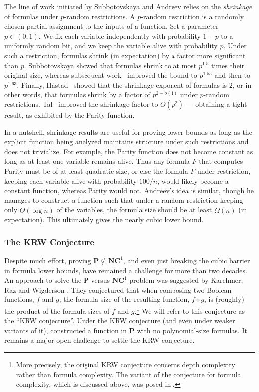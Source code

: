 \documentclass[11pt]{article}
\numberwithin{equation}{section}
\theoremstyle{definition}
\theoremstyle{plain}
\theoremstyle{definition}\newtheorem{notation}[theorem]{Notation}\theoremstyle{plain}
\renewcommand{\P}{\mathbf{P}}
\newcommand{\NC}{\mathbf{NC}}
\renewcommand{\d}{\diamond}
\theoremstyle{definition}
\theoremstyle{plain}
\begin{document}
The line of work initiated by Subbotovskaya and Andreev relies on
the \emph{shrinkage} of formulas under $p$-random restrictions. A
$p$-random restriction is a randomly chosen partial assignment to
the inputs of a function. Set a parameter $p\in(0,1)$. We fix each
variable independently with probability $1-p$ to a uniformly random
bit, and we keep the variable alive with probability $p$. Under such
a restriction, formulas shrink (in expectation) by a factor more significant
than $p$. Subbotovskaya showed that formulas shrink to
at most $p^{1.5}$ times their original size, whereas subsequent
%
work~\cite{PZ93,IN93}  %
improved the bound to $p^{1.55}$ and
then to  %
$p^{1.63}$.
%
%
%
%
Finally, H{\aa}stad~\cite{H98} showed that the shrinkage
exponent of formulas is $2$, or in other words, that 
formulas shrink by a factor of $p^{2-o(1)}$ under $p$-random restrictions.
Tal~\cite{T14} improved the shrinkage factor to $O(p^{2})$ ---
obtaining a tight result, as exhibited by the Parity function.

In a nutshell, shrinkage results are useful %
for  %
proving lower bounds
as long as the explicit function being analyzed maintains structure
under such restrictions and does not trivialize. For example, the
Parity function does not become constant as long as at least one variable
remains alive. Thus any formula $F$ that computes Parity must be
of at least quadratic size, or else the formula $F$ under restriction,
keeping each variable alive with probability $100/n$, would likely
become a constant function, whereas Parity would not. Andreev's idea
is similar, though he manages to construct a function such that under
a random restriction keeping only $\Theta(\log n)$ of the variables,
the formula size should be at least $\tilde{\Omega}(n)$ (in expectation).
This ultimately gives the nearly cubic lower bound.

%
\subsubsection{The KRW Conjecture}  %

Despite much effort, proving $\P\not\subseteq\NC^{1}$, and even just
breaking the \textsf{cubic barrier} in formula lower bounds, have
remained a challenge for more than two decades. An approach to solve
the $\P$ versus $\NC^{1}$ problem was suggested by Karchmer, Raz
and Wigderson \cite{KRW95}. They conjectured that when composing
two Boolean functions, $f$ and $g$, the formula size of the resulting
function, $f\d g$, is (roughly) the product of the formula sizes
of $f$ and $g$.\footnote{More precisely, the original KRW conjecture \cite{KRW95} concerns
depth complexity rather than formula complexity. The variant of the
conjecture for formula complexity, which is discussed above, was posed
in \cite{GMWW17}. } We will refer to this conjecture as the \textsf{``KRW conjecture''}.
Under the KRW conjecture (and even under weaker variants of it), \cite{KRW95}
constructed a function in $\P$ with no polynomial-size formulas.
It remains a major open challenge to settle the KRW conjecture.
\end{document}
